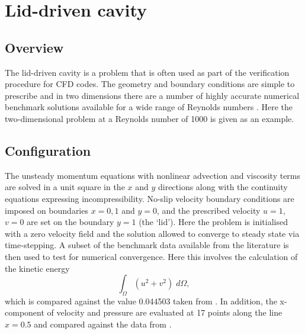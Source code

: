 
\section{Lid-driven cavity}
\label{sect:lid_driven_cavity}

\subsection{Overview}
The lid-driven cavity is a problem that is often used as part of the verification procedure for
CFD codes. The geometry and boundary conditions are simple to prescribe and in
two dimensions there are a number of highly accurate numerical benchmark solutions
available for a wide range of Reynolds numbers \citep{botella1998,bruneau2006,erturk2005}. Here the two-dimensional
problem at a Reynolds number of 1000 is given as an example.

\subsection{Configuration}
The unsteady momentum equations with nonlinear advection and viscosity
terms are solved in a unit square in the $x$ and $y$
directions along with the continuity equations expressing incompressibility. 
No-slip velocity boundary conditions are imposed on boundaries $x=0,1$ and $y=0$, and the prescribed velocity $u=1$, $v=0$ are
set on the boundary $y=1$ (the `lid'). Here the problem is initialised with a zero velocity field and the solution
allowed to converge to steady state via time-stepping.
A subset of the benchmark data available from the literature is then used to
test for numerical convergence. Here this involves the calculation of the kinetic energy
\begin{equation}
\int_{\Omega} (u^2+v^2) \; d\Omega,
\end{equation}
which is compared against the value 0.044503 taken from \cite{bruneau2006}. In addition, the x-component of velocity and
pressure are evaluated at 17 points along the line $x=0.5$ and compared against the data from \cite{botella1998}.



